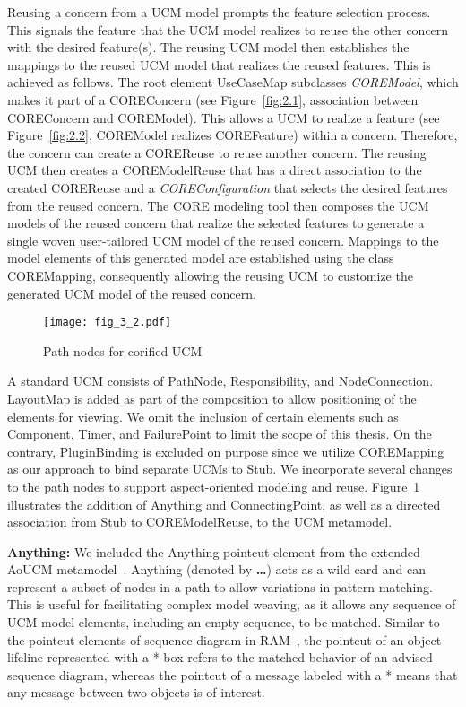 Reusing a concern from a UCM model prompts the feature selection process. This signals the feature that the UCM model realizes to reuse the other concern with the desired feature(s). The reusing UCM model then establishes the mappings to the reused UCM model that realizes the reused features. This is achieved as follows. The root element {\cls UseCaseMap} subclasses \textit{\cls COREModel}, which makes it part of a {\cls COREConcern} (see Figure~\ref{fig:2.1}, association between {\cls COREConcern} and {\cls COREModel}). This allows a UCM to realize a feature (see Figure~\ref{fig:2.2}, {\cls COREModel} realizes {\cls COREFeature}) within a concern. Therefore, the concern can create a {\cls COREReuse} to reuse another concern. The reusing UCM then creates a {\cls COREModelReuse} that has a direct association to the created {\cls COREReuse} and a \textit{\cls COREConfiguration} that selects the desired features from the reused concern. The CORE modeling tool then composes the UCM models of the reused concern that realize the selected features to generate a single woven user-tailored UCM model of the reused concern. Mappings to the model elements of this generated model are established using the class {\cls COREMapping}, consequently allowing the reusing UCM to customize the generated UCM model of the reused concern.

\begin{figure}
	\centering
	\texttt{[image: fig\_3\_2.pdf]}
	\caption{Path nodes for corified UCM}
	\label{fig:3.2}
\end{figure}

A standard UCM consists of {\cls PathNode}, {\cls Responsibility}, and {\cls NodeConnection}. {\cls LayoutMap} is added as part of the composition to allow positioning of the elements for viewing. We omit the inclusion of certain elements such as {\cls Component}, {\cls Timer}, and {\cls FailurePoint} to limit the scope of this thesis. On the contrary, {\cls PluginBinding} is excluded on purpose since we utilize {\cls COREMapping} as our approach to bind separate UCMs to {\cls Stub}. We incorporate several changes to the path nodes to support aspect-oriented modeling and reuse. Figure~\ref{fig:3.2} illustrates the addition of {\cls Anything} and {\cls ConnectingPoint}, as well as a directed association from {\cls Stub} to {\cls COREModelReuse}, to the UCM metamodel.

\textbf{\cls Anything:} We included the {\cls Anything} pointcut element from the extended AoUCM metamodel~\cite{mussbacher2011aspect}. {\cls Anything} (denoted by \textbf{\ldots}) acts as a wild card and can represent a subset of nodes in a path to allow variations in pattern matching. This is useful for facilitating complex model weaving, as it allows any sequence of UCM model elements, including an empty sequence, to be matched. Similar to the pointcut elements of sequence diagram in RAM~\cite{kienzle2009aspect}, the pointcut of an object lifeline represented with a *-box refers to the matched behavior of an advised sequence diagram, whereas the pointcut of a message labeled with a * means that any message between two objects is of interest.

